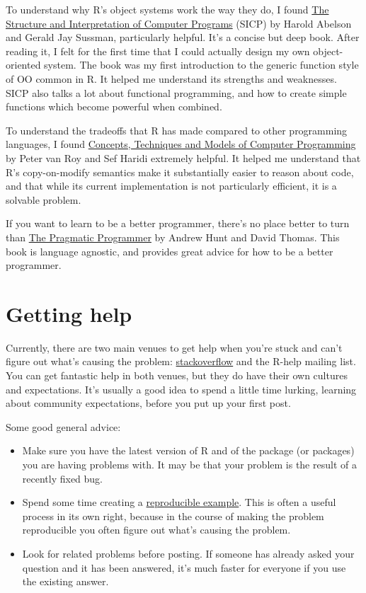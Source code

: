 To understand why R's object systems work the way they do, I found
\href{http://mitpress.mit.edu/sicp/full-text/book/book.html}{The
Structure and Interpretation of Computer Programs} (SICP) by Harold
Abelson and Gerald Jay Sussman, particularly helpful. It's a concise but
deep book. After reading it, I felt for the first time that I could
actually design my own object-oriented system. The book was my first
introduction to the generic function style of OO common in R. It helped
me understand its strengths and weaknesses. SICP also talks a lot about
functional programming, and how to create simple functions which become
powerful when combined.

To understand the tradeoffs that R has made compared to other
programming languages, I found
\href{http://amzn.com/0262220695?tag=devtools-20}{Concepts, Techniques
and Models of Computer Programming} by Peter van Roy and Sef Haridi
extremely helpful. It helped me understand that R's copy-on-modify
semantics make it substantially easier to reason about code, and that
while its current implementation is not particularly efficient, it is a
solvable problem.

If you want to learn to be a better programmer, there's no place better
to turn than \href{http://amzn.com/020161622X?tag=devtools-20}{The
Pragmatic Programmer} by Andrew Hunt and David Thomas. This book is
language agnostic, and provides great advice for how to be a better
programmer.

\section{Getting help}\label{getting-help}

Currently, there are two main venues to get help when you're stuck and
can't figure out what's causing the problem:
\href{http://stackoverflow.com}{stackoverflow} and the R-help mailing
list. You can get fantastic help in both venues, but they do have their
own cultures and expectations. It's usually a good idea to spend a
little time lurking, learning about community expectations, before you
put up your first post.

Some good general advice:

\begin{itemize}
\item
  Make sure you have the latest version of R and of the package (or
  packages) you are having problems with. It may be that your problem is
  the result of a recently fixed bug.
\item
  Spend some time creating a
  \href{http://stackoverflow.com/questions/5963269}{reproducible
  example}. This is often a useful process in its own right, because in
  the course of making the problem reproducible you often figure out
  what's causing the problem.
\item
  Look for related problems before posting. If someone has already asked
  your question and it has been answered, it's much faster for everyone
  if you use the existing answer.
\end{itemize}

